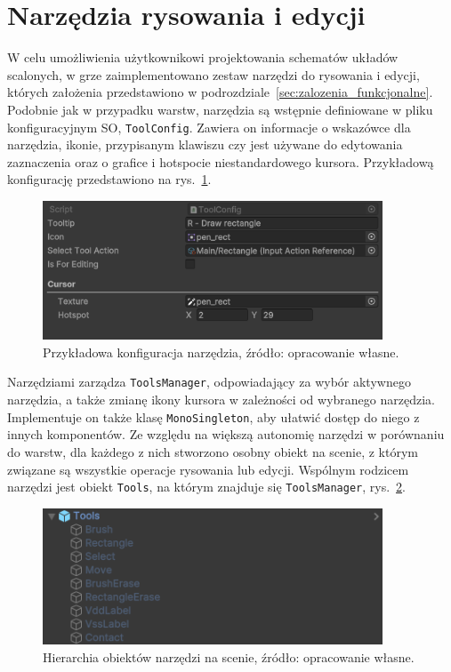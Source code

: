 \section{Narzędzia rysowania i edycji}
\label{sec:narzedzia_rysowania_i_edycji}

W celu umożliwienia użytkownikowi projektowania schematów układów scalonych,
w grze zaimplementowano zestaw narzędzi do rysowania i edycji, których założenia przedstawiono w podrozdziale~\ref{sec:zalozenia_funkcjonalne}.
Podobnie jak w przypadku warstw, narzędzia są wstępnie definiowane w pliku konfiguracyjnym SO, \texttt{ToolConfig}.
Zawiera on informacje o wskazówce dla narzędzia, ikonie, przypisanym klawiszu czy jest używane do edytowania zaznaczenia
oraz o grafice i hotspocie niestandardowego kursora.
Przykładową konfigurację przedstawiono na rys.~\ref{fig:tool_config}.

\begin{figure}[h!]
    \centering
    \includegraphics[width=0.9\textwidth]{chapters/chapter4/rys/tool_config}
    \caption[Przykładowa konfiguracja narzędzia.]{Przykładowa konfiguracja narzędzia, źródło: opracowanie własne.}
    \label{fig:tool_config}
\end{figure}

Narzędziami zarządza \texttt{ToolsManager}, odpowiadający za wybór aktywnego narzędzia,
a także zmianę ikony kursora w zależności od wybranego narzędzia.
Implementuje on także klasę \texttt{MonoSingleton}, aby ułatwić dostęp do niego z innych komponentów.
Ze względu na większą autonomię narzędzi w porównaniu do warstw,
dla każdego z nich stworzono osobny obiekt na scenie, z którym związane są wszystkie operacje rysowania lub edycji.
Wspólnym rodzicem narzędzi jest obiekt \texttt{Tools}, na którym znajduje się \texttt{ToolsManager},
rys.~\ref{fig:tools_hierarchy}.

\begin{figure}[h!]
    \centering
    \includegraphics[width=0.9\textwidth]{chapters/chapter4/rys/tools_hierarchy}
    \caption[Hierarchia obiektów narzędzi na scenie.]{Hierarchia obiektów narzędzi na scenie, źródło: opracowanie własne.}
    \label{fig:tools_hierarchy}
\end{figure}

